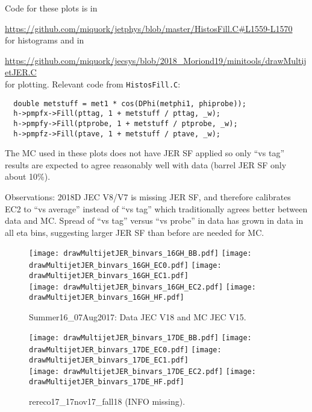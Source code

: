 \documentclass[landscape,10pt]{beamer} %
\begin{document}
Code for these plots is in\\ 
{\small
\url{https://github.com/miquork/jetphys/blob/master/HistosFill.C#L1559-L1570}\\
for histograms and in\\
{\small
\url{https://github.com/miquork/jecsys/blob/2018_Moriond19/minitools/drawMultijetJER.C}\\
for plotting. Relevant code from \verb|HistosFill.C|:
\begin{verbatim}
  double metstuff = met1 * cos(DPhi(metphi1, phiprobe));
  h->pmpfx->Fill(pttag, 1 + metstuff / pttag, _w);
  h->pmpfy->Fill(ptprobe, 1 + metstuff / ptprobe, _w);
  h->pmpfz->Fill(ptave, 1 + metstuff / ptave, _w);
\end{verbatim}

The MC used in these plots does not have JER SF applied so only ``vs tag'' results are expected to agree reasonably well with data (barrel JER SF only about 10\%).

Observations: 2018D JEC V8/V7 is missing JER SF, and therefore calibrates EC2 to ``vs average'' instead of ``vs tag'' which traditionally agrees better between data and MC. Spread of ``vs tag'' versus ``vs probe'' in data has grown in data in all eta bins, suggesting larger JER SF than before are needed for MC.

\newpage

\begin{figure}[p]
\centering
  \texttt{[image: drawMultijetJER\_binvars\_16GH\_BB.pdf]}
  \texttt{[image: drawMultijetJER\_binvars\_16GH\_EC0.pdf]}
  \texttt{[image: drawMultijetJER\_binvars\_16GH\_EC1.pdf]}\\
  \texttt{[image: drawMultijetJER\_binvars\_16GH\_EC2.pdf]}
  \texttt{[image: drawMultijetJER\_binvars\_16GH\_HF.pdf]}
\caption{Summer16\_07Aug2017: Data JEC V18 and MC JEC V15.}
\end{figure}

\newpage

\begin{figure}[p]
\centering
  \texttt{[image: drawMultijetJER\_binvars\_17DE\_BB.pdf]}
  \texttt{[image: drawMultijetJER\_binvars\_17DE\_EC0.pdf]}
  \texttt{[image: drawMultijetJER\_binvars\_17DE\_EC1.pdf]}\\
  \texttt{[image: drawMultijetJER\_binvars\_17DE\_EC2.pdf]}
  \texttt{[image: drawMultijetJER\_binvars\_17DE\_HF.pdf]}
\caption{rereco17\_17nov17\_fall18 (INFO missing).}
\end{figure}

}}
\end{document}
